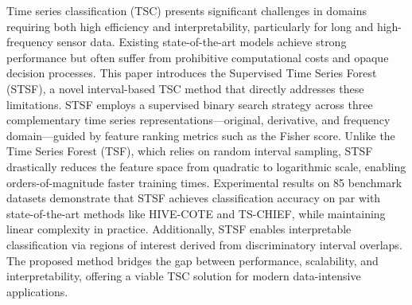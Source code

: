 Time series classification (TSC) presents significant challenges in domains requiring both 
high efficiency and interpretability, particularly for long and high-frequency sensor data. 
Existing state-of-the-art models achieve strong performance but often suffer from prohibitive
computational costs and opaque decision processes. This paper introduces the Supervised Time 
Series Forest (STSF), a novel interval-based TSC method that directly addresses these limitations. 
STSF employs a supervised binary search strategy across three complementary time series 
representations—original, derivative, and frequency domain—guided by feature ranking metrics 
such as the Fisher score. Unlike the Time Series Forest (TSF), which relies on random interval 
sampling, STSF drastically reduces the feature space from quadratic to logarithmic scale, enabling 
orders-of-magnitude faster training times. Experimental results on 85 benchmark datasets 
demonstrate that STSF achieves classification accuracy on par with state-of-the-art methods like 
HIVE-COTE and TS-CHIEF, while maintaining linear complexity in practice. Additionally, STSF enables 
interpretable classification via regions of interest derived from discriminatory interval overlaps.
The proposed method bridges the gap between performance, scalability, and interpretability, 
offering a viable TSC solution for modern data-intensive applications.
